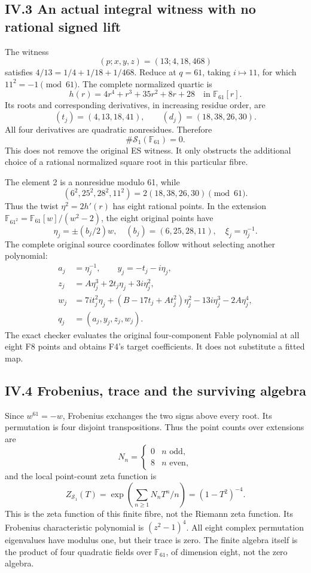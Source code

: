\subsection{IV.3 An actual integral witness with no rational signed
lift}\label{iv.3-an-actual-integral-witness-with-no-rational-signed-lift}

The witness \[
(p;x,y,z)=(13;4,18,468)
\] satisfies \(4/13=1/4+1/18+1/468\). Reduce at \(q=61\), taking
\(i\mapsto11\), for which \(11^2=-1\pmod{61}\). The complete normalized
quartic is \[
h(r)=4r^4+r^3+35r^2+8r+28\quad\text{in }\mathbb F_{61}[r].
\tag{F4}
\] Its roots and corresponding derivatives, in increasing residue order,
are \[
(t_j)=(4,13,18,41),\qquad(d_j)=(18,38,26,30).
\tag{F5}
\] All four derivatives are quadratic nonresidues. Therefore \[
\boxed{\#\mathscr S_1(\mathbb F_{61})=0.}
\tag{F6}
\] This does not remove the original ES witness. It only obstructs the
additional choice of a rational normalized square root in this
particular fibre.

The element 2 is a nonresidue modulo 61, while \[
(6^2,25^2,28^2,11^2)=2(18,38,26,30)\pmod{61}.
\] Thus the twist \(\eta^2=2h'(r)\) has eight rational points. In the
extension \(\mathbb F_{61^2}=\mathbb F_{61}[w]/(w^2-2)\), the eight
original points have \[
\eta_j=\pm(b_j/2)w,\quad(b_j)=(6,25,28,11),\quad \xi_j=\eta_j^{-1}.
\tag{F7}
\] The complete original source coordinates follow without selecting
another polynomial: \[
\begin{aligned}
a_j&=\eta_j^{-1},\qquad y_j=-t_j-i\eta_j,\\
z_j&=A\eta_j^3+2t_j\eta_j+3i\eta_j^2,\\
w_j&=7it_j^2\eta_j+(B-17t_j+At_j^2)\eta_j^2
-13i\eta_j^3-2A\eta_j^4,\\
q_j&=(a_j,y_j,z_j,w_j).
\end{aligned}
\tag{F8}
\] The exact checker evaluates the original four-component Fable
polynomial at all eight F8 points and obtains F4's target coefficients.
It does not substitute a fitted map.

\subsection{IV.4 Frobenius, trace and the surviving
algebra}\label{iv.4-frobenius-trace-and-the-surviving-algebra}

Since \(w^{61}=-w\), Frobenius exchanges the two signs above every root.
Its permutation is four disjoint transpositions. Thus the point counts
over extensions are \[
N_n=\begin{cases}0&n\text{ odd},\\8&n\text{ even},\end{cases}
\] and the local point-count zeta function is \[
\boxed{Z_{\mathscr S_1}(T)
=\exp\left(\sum_{n\ge1}N_nT^n/n\right)=(1-T^2)^{-4}.}
\tag{F9}
\] This is the zeta function of this finite fibre, not the Riemann zeta
function. Its Frobenius characteristic polynomial is \((z^2-1)^4\). All
eight complex permutation eigenvalues have modulus one, but their trace
is zero. The finite algebra itself is the product of four quadratic
fields over \(\mathbb F_{61}\), of dimension eight, not the zero
algebra.

